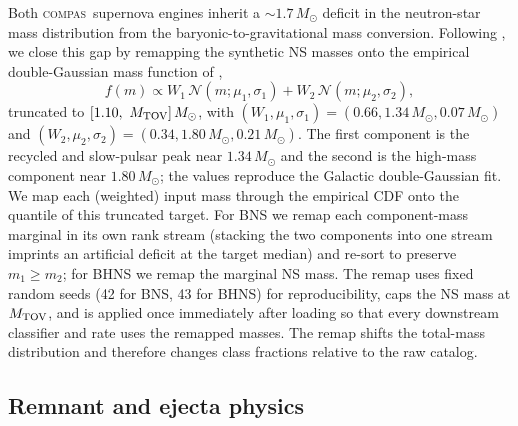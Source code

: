 \documentclass[twocolumn,amsmath]{aastex702}
\newcommand{\Msun}{M_\odot}
\newcommand{\Mtov}{M_{\rm TOV}}
\newcommand{\compas}{\textsc{compas}}
\begin{document}
Both \compas\ supernova engines inherit a $\sim 1.7\,\Msun$ deficit in the
neutron-star mass distribution from the \citet{fryer2012} baryonic-to-gravitational
mass conversion. Following \citet{mandel2020}, we close this gap by remapping the
synthetic NS masses onto the empirical double-Gaussian mass function of
\citet{alsing2018},
\begin{equation}
f(m) \propto W_1\,\mathcal{N}(m; \mu_1, \sigma_1) + W_2\,\mathcal{N}(m; \mu_2, \sigma_2),
\label{eq:nsremap}
\end{equation}
truncated to $[1.10,\ \Mtov]\,\Msun$, with $(W_1, \mu_1, \sigma_1) = (0.66, 1.34\,\Msun, 0.07\,\Msun)$
and $(W_2, \mu_2, \sigma_2) = (0.34, 1.80\,\Msun, 0.21\,\Msun)$. The first component is the
recycled and slow-pulsar peak near $1.34\,\Msun$ and the second is the high-mass
component near $1.80\,\Msun$; the values reproduce the \citet{alsing2018} Galactic
double-Gaussian fit. We map each (weighted) input mass through the empirical CDF onto
the quantile of this truncated target. For BNS we remap each component-mass
marginal in its own rank stream (stacking the two components into one stream
imprints an artificial deficit at the target median) and re-sort to
preserve $m_1 \geq m_2$; for BHNS we remap the marginal NS mass. The remap uses
fixed random seeds (42 for BNS, 43 for BHNS) for reproducibility, caps the NS mass
at $\Mtov$, and is applied once immediately after loading so that every downstream
classifier and rate uses the remapped masses. The remap shifts the total-mass
distribution and therefore changes class fractions relative to the raw catalog.

\subsection{Remnant and ejecta physics} \label{sec:remnant}
\end{document}
